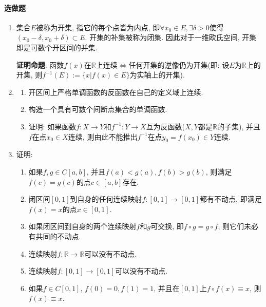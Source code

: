 \documentclass[UTF8,11pt, a4paper, oneside, fontset=none]{ctexbook}
\begin{document}
\paragraph{选做题}
\begin{enumerate}

\item 集合$E$被称为开集, 指它的每个点皆为内点, 即$\forall x_0 \in E, \exists \delta >0$使得$(x_0 - \delta, x_0 + \delta ) \subset E$. 开集的补集被称为闭集. 因此对于一维欧氏空间, 开集即是可数个开区间的并集.

{\bf 证明命题}: 函数$f(x)$在$\mathbb R$上连续$\Leftrightarrow$任何开集的逆像仍为开集(即: 设$E$为$\mathbb R$上的开集, 则$f^{-1}(E) := \{ x | f(x) \in E \}$为实轴上的开集).


\item 

\begin{enumerate}

\item 开区间上严格单调函数的反函数在自己的定义域上连续.

\item 构造一个具有可数个间断点集合的单调函数.

\item 证明: 如果函数$f : X \to Y$和$f^{-1} : Y \to X$互为反函数($X, Y$都是$\mathbb R$的子集), 并且$f$在点$x_0 \in X$连续, 则由此不能推出$f^{-1}$在点$y_0 = f(x_0) \in Y$连续.
\end{enumerate}

\item 证明:
\begin{enumerate}

\item 如果$f, g \in C[a, b]$, 并且$f(a) < g(a), f(b) > g(b)$, 则满足$f(c) = g(c)$的点$c \in [a, b]$存在.

\item 闭区间$[0, 1]$到自身的任何连续映射$f : [0, 1] \to [0, 1]$都有不动点, 即满足$f(x) = x$的点$x \in [0, 1]$.

\item 如果闭区间到自身的两个连续映射$f$和$g$可交换, 即$f \circ g = g \circ f$, 则它们未必有共同的不动点. 

\item 连续映射$f : \mathbb R \to \mathbb R$可以没有不动点.

\item 连续映射$f : [0, 1] \to [0, 1]$可以没有不动点.

\item 如果$f \in C[0, 1]$, $f(0) = 0, f(1) = 1$, 并且在$[0, 1]$上$f \circ f (x) \equiv x$, 则$f (x) \equiv x$.
\end{enumerate}


\end{enumerate}
\end{document}
